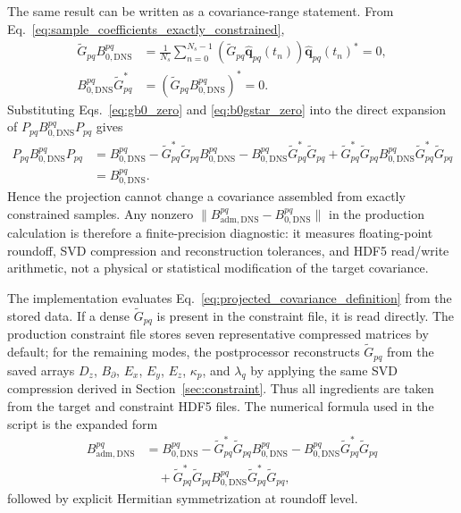 \documentclass[11pt]{article}
\newcommand{\bfq}{\bm{q}}
\newcommand{\Gtilde}{\widetilde{G}}
\newcommand{\Ez}{E_z}
\newcommand{\Ex}{E_x}
\newcommand{\Ey}{E_y}
\newcommand{\Dz}{D_z}
\newcommand{\Bbdry}{B_{\partial}}
\newcommand{\Bzero}{B_{0,\mathrm{DNS}}}
\newcommand{\Badm}{B_{\mathrm{adm},\mathrm{DNS}}}
\newcommand{\Pmat}{P}
\begin{document}
The same result can be written as a covariance-range statement. From
Eq.~\eqref{eq:sample_coefficients_exactly_constrained},
\begin{align}
  \Gtilde_{pq}\Bzero^{pq}
  &=
  \frac{1}{N_s}
  \sum_{n=0}^{N_s-1}
  \left(\Gtilde_{pq}\widehat{\bfq}_{pq}(t_n)\right)
  \widehat{\bfq}_{pq}(t_n)^*
  =
  0, \label{eq:gb0_zero}\\
  \Bzero^{pq}\Gtilde_{pq}^*
  &=
  \left(\Gtilde_{pq}\Bzero^{pq}\right)^*
  =
  0. \label{eq:b0gstar_zero}
\end{align}
Substituting Eqs.~\eqref{eq:gb0_zero} and \eqref{eq:b0gstar_zero} into the
direct expansion of \(\Pmat_{pq}\Bzero^{pq}\Pmat_{pq}\) gives
\begin{align}
  \Pmat_{pq}\Bzero^{pq}\Pmat_{pq}
  &=
  \Bzero^{pq}
  -
  \Gtilde_{pq}^*\Gtilde_{pq}\Bzero^{pq}
  -
  \Bzero^{pq}\Gtilde_{pq}^*\Gtilde_{pq}
  +
  \Gtilde_{pq}^*\Gtilde_{pq}
  \Bzero^{pq}
  \Gtilde_{pq}^*\Gtilde_{pq} \nonumber\\
  &=
  \Bzero^{pq}.
  \label{eq:range_proof_b0_projection}
\end{align}
Hence the projection cannot change a covariance assembled from exactly
constrained samples. Any nonzero \(\|\Badm^{pq}-\Bzero^{pq}\|\) in the
production calculation is therefore a finite-precision diagnostic: it measures
floating-point roundoff, SVD compression and reconstruction tolerances, and
HDF5 read/write arithmetic, not a physical or statistical modification of the
target covariance.

The implementation evaluates Eq.~\eqref{eq:projected_covariance_definition}
from the stored data. If a dense \(\Gtilde_{pq}\) is present in the constraint
file, it is read directly. The production constraint file stores seven
representative compressed matrices by default; for the remaining modes, the
postprocessor reconstructs \(\Gtilde_{pq}\) from the saved arrays
\(\Dz\), \(\Bbdry\), \(\Ex\), \(\Ey\), \(\Ez\), \(\kappa_p\), and
\(\lambda_q\) by applying the same SVD compression derived in
Section~\ref{sec:constraint}. Thus all ingredients are taken from the target
and constraint HDF5 files. The numerical formula used in the script is the
expanded form
\begin{align}
  \Badm^{pq}
  &=
  \Bzero^{pq}
  -
  \Gtilde_{pq}^*\Gtilde_{pq}\Bzero^{pq}
  -
  \Bzero^{pq}\Gtilde_{pq}^*\Gtilde_{pq} \nonumber\\
  &\quad
  +
  \Gtilde_{pq}^*\Gtilde_{pq}
  \Bzero^{pq}
  \Gtilde_{pq}^*\Gtilde_{pq},
  \label{eq:projected_covariance_expanded}
\end{align}
followed by explicit Hermitian symmetrization at roundoff level.
\end{document}
